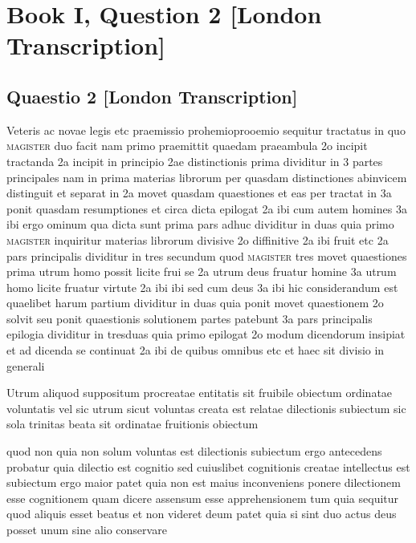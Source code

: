 \documentclass[twoside, openright]{article}
\newcommand{\name}[1]{\textsc{#1}}
\begin{document}
        \chapter*{Book I, Question 2 [London Transcription]}
        
         
        \beginnumbering
         \section*{Quaestio 2 [London Transcription]} 
        \pstart
        Veteris ac novae legis etc praemissio prohemioprooemio sequitur tractatus in quo \name{magister} duo facit nam primo praemittit quaedam praeambula 2o incipit tractanda 2a incipit in principio 2ae distinctionis prima dividitur in 3 partes principales nam in prima materias librorum per quasdam distinctiones abinvicem distinguit et separat in 2a movet quasdam quaestiones et eas per tractat in 3a ponit quasdam resumptiones et circa dicta epilogat  2a ibi cum autem homines 3a ibi ergo ominum qua dicta sunt prima pars adhuc dividitur in duas quia primo \name{magister} inquiritur materias librorum divisive 2o diffinitive 2a ibi fruit etc 2a pars principalis dividitur in tres secundum quod \name{magister} tres movet quaestiones prima utrum homo possit licite frui se  2a utrum deus fruatur homine 3a utrum homo licite fruatur virtute 2a ibi ibi sed cum deus 3a ibi hic considerandum est  quaelibet harum partium dividitur in duas quia ponit movet quaestionem 2o solvit seu ponit quaestionis solutionem partes patebunt  3a pars principalis epilogia dividitur in tresduas quia primo epilogat  2o modum dicendorum insipiat et ad dicenda se continuat 2a ibi de quibus omnibus etc et haec sit divisio in generali 
        \pend
     
        \pstart
        Utrum aliquod suppositum procreatae entitatis sit fruibile obiectum ordinatae voluntatis  vel sic utrum sicut voluntas creata est relatae dilectionis subiectum sic sola trinitas beata sit ordinatae fruitionis obiectum 
        \pend
     
        \pstart
        quod non quia non solum voluntas est dilectionis subiectum ergo antecedens probatur quia dilectio est cognitio sed cuiuslibet cognitionis creatae intellectus est subiectum ergo  maior patet quia non est maius inconveniens ponere dilectionem esse cognitionem quam dicere assensum esse apprehensionem  tum quia sequitur quod aliquis esset beatus et non videret deum patet quia si sint duo actus deus posset unum sine alio conservare
        \pend
     
\end{document}
